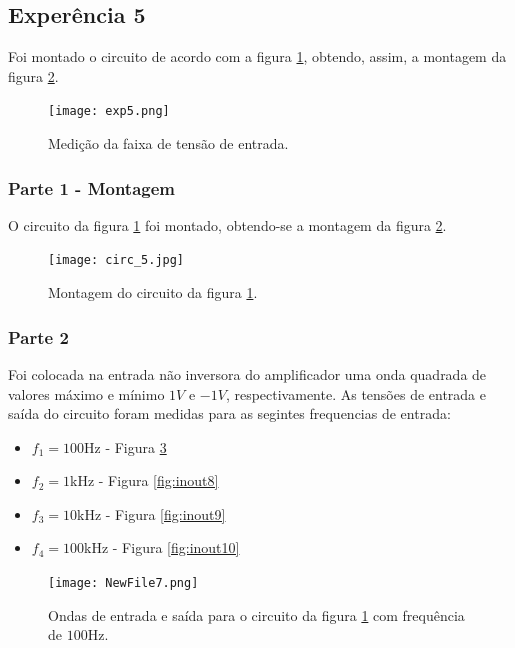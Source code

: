 \documentclass{abntex2}
\begin{document}
\clearpage

\subsection{Experência 5}

Foi montado o circuito de acordo com a figura \ref{fig:circuito6}, obtendo, assim, a montagem da figura \ref{fig:montagem7}.

\begin{figure}[h]
  \centering
  \texttt{[image: exp5.png]}
  \caption{Medição da faixa de tensão de entrada.}
  \label{fig:circuito6}
\end{figure}

\subsubsection{Parte 1 - Montagem}

O circuito da figura \ref{fig:circuito6} foi montado, obtendo-se a montagem da figura \ref{fig:montagem7}.

\begin{figure}[h]
  \centering
  \texttt{[image: circ\_5.jpg]}
  \caption{Montagem do circuito da figura \ref{fig:circuito6}.}
  \label{fig:montagem7}
\end{figure}

\subsubsection{Parte 2}

Foi colocada na entrada não inversora do amplificador uma onda quadrada de valores máximo e mínimo $1V$ e $-1V$, respectivamente. As tensões de entrada e saída do circuito foram medidas para as segintes frequencias de entrada:
\begin{itemize}
  \item $f_1 = 100$Hz - Figura \ref{fig:inout7}
  \item $f_2 = 1$kHz - Figura \ref{fig:inout8}
  \item $f_3 = 10$kHz - Figura \ref{fig:inout9}
  \item $f_4 = 100$kHz - Figura \ref{fig:inout10}
\end{itemize}

\begin{figure}[h]
  \centering
  \texttt{[image: NewFile7.png]}
  \caption{Ondas de entrada e saída para o circuito da figura \ref{fig:circuito6} com frequência de $100$Hz.}
  \label{fig:inout7}
\end{figure}
\end{document}
